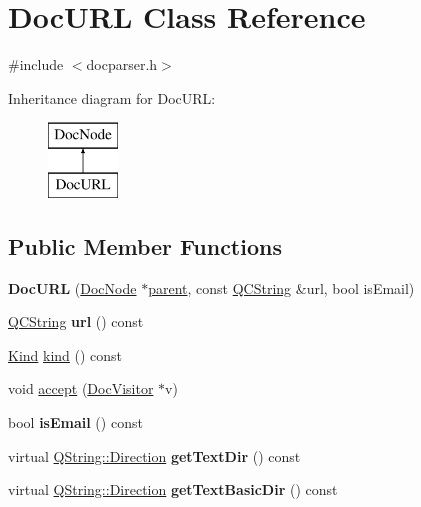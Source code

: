 \hypertarget{class_doc_u_r_l}{}\section{Doc\+U\+RL Class Reference}
\label{class_doc_u_r_l}


{\ttfamily \#include $<$docparser.\+h$>$}

Inheritance diagram for Doc\+U\+RL\+:\begin{figure}[H]
\begin{center}
\leavevmode
\includegraphics[height=2.000000cm]{class_doc_u_r_l}
\end{center}
\end{figure}
\subsection*{Public Member Functions}
\begin{DoxyCompactItemize}
\item 
\mbox{\label{class_doc_u_r_l_ac3f8801a6f7507cbed9a9af5bd8d89be}} 
{\bfseries Doc\+U\+RL} (\mbox{\hyperlink{class_doc_node}{Doc\+Node}} $\ast$\mbox{\hyperlink{class_doc_node_a73e8ad29a91cfceb0968eb00db71a23d}{parent}}, const \mbox{\hyperlink{class_q_c_string}{Q\+C\+String}} \&url, bool is\+Email)
\item 
\mbox{\label{class_doc_u_r_l_a06354fa0923e369dc58da474622528a0}} 
\mbox{\hyperlink{class_q_c_string}{Q\+C\+String}} {\bfseries url} () const
\item 
\mbox{\hyperlink{class_doc_node_aebd16e89ca590d84cbd40543ea5faadb}{Kind}} \mbox{\hyperlink{class_doc_u_r_l_a030f1583c90947d5fb00be872c094183}{kind}} () const
\item 
void \mbox{\hyperlink{class_doc_u_r_l_a15d23d59342d72ebc769947aca10e972}{accept}} (\mbox{\hyperlink{class_doc_visitor}{Doc\+Visitor}} $\ast$v)
\item 
\mbox{\label{class_doc_u_r_l_ac2e7983ca9569098860da2ce21fa25f6}} 
bool {\bfseries is\+Email} () const
\item 
\mbox{\label{class_doc_u_r_l_a7b2de86b5aa28631e361fc145235cd1f}} 
virtual \mbox{\hyperlink{class_q_string_acaff43b133319ea651f19aac6b967406}{Q\+String\+::\+Direction}} {\bfseries get\+Text\+Dir} () const
\item 
\mbox{\label{class_doc_u_r_l_ab2621ec0b17a43ad0a4f7fa19a8f5e8d}} 
virtual \mbox{\hyperlink{class_q_string_acaff43b133319ea651f19aac6b967406}{Q\+String\+::\+Direction}} {\bfseries get\+Text\+Basic\+Dir} () const
\end{DoxyCompactItemize}
